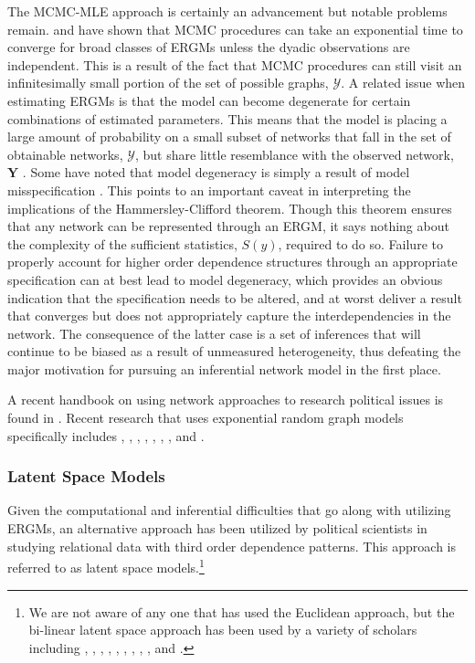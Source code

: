 The MCMC-MLE approach is certainly an advancement but notable problems remain. \citet{bhamidi:etal:2008} and \citet{chatterjee:diaconis:2013} have shown that MCMC procedures can take an exponential time to converge for broad classes of ERGMs unless the dyadic observations are independent. This is a result of the fact that MCMC procedures can still visit an infinitesimally small portion of the set of possible graphs, $\mathcal{Y}$. A related issue when estimating ERGMs is that the model can become degenerate for certain combinations of estimated parameters.  This means that the model is placing a large amount of probability on a small subset of networks that fall in the set of obtainable networks, $\mathcal{Y}$, but share little resemblance with the observed network, $\mathbf{Y}$ \citep{schweinberger:2011}. Some have noted that model degeneracy is simply a result of model misspecification \citep{handcock:2003b,goodreau:etal:2008,handcock:etal:2008}. This points to an important caveat in interpreting the implications of the Hammersley-Clifford theorem. Though this theorem ensures that any network can be represented through an ERGM, it says nothing about the complexity of the sufficient statistics, $S(y)$, required to do so. Failure to properly account for higher order dependence structures through an appropriate specification can at best lead to model degeneracy, which provides an obvious indication that the specification needs to be altered, and at worst deliver a result that converges but does not appropriately capture the interdependencies in the network. The consequence of the latter case is a set of inferences that will continue to be biased as a result of unmeasured heterogeneity, thus defeating the major motivation for pursuing an inferential network model in the first place. 

A recent handbook on using network approaches to research political issues is found in 
\citet{victor:etal:2016}.  Recent research that uses exponential random graph models specifically includes 
\citet{victor:ringe:2009},
\citet{berardo:scholz:2010},
\citet{calvo:leiras:2012},
\citet{lubell:etal:2012},
\citet{robbins:etal:2012},
\citet{leman:calvo:2013},
\citet{heaney:2014}, and
\citet{kirkland:williams:2014}.




\subsubsection{\textbf{Latent Space Models}}

Given the computational and inferential difficulties that go along with utilizing ERGMs, an alternative approach  has been utilized by political scientists in studying relational data with third order dependence patterns. This approach is referred to as latent space models.\footnote{We are not aware of any one that has used the Euclidean approach, but the bi-linear latent space approach has been used by a variety of scholars including \citet{hoff:ward:2004}
\citet{cao:2007},
\citet{ward:etal:2007},
\citet{ward:hoff:2007},
\citet{cao:2009},
\citet{breunig:etal:2012},
\citet{cao:2012},
\citet{ward:etal:2012},
\citet{ward:hoff:2008},
\citet{metternich:etal:2015}, and
\citet{cao:ward:2014}.}

